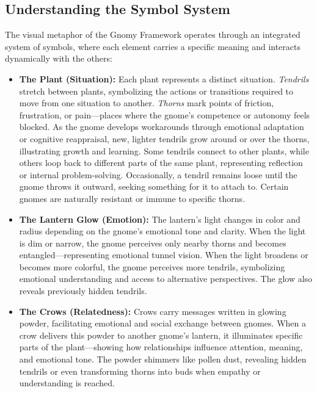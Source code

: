 \documentclass{article}
\begin{document}
\vspace{1em}
\subsection*{Understanding the Symbol System}
The visual metaphor of the Gnomy Framework operates through an integrated system of symbols, where each element carries a specific meaning and interacts dynamically with the others:

\begin{itemize}[noitemsep,topsep=0pt]

    \item \textbf{The Plant (Situation):}  
    Each plant represents a distinct situation. \textit{Tendrils} stretch between plants, symbolizing the actions or transitions required to move from one situation to another. \textit{Thorns} mark points of friction, frustration, or pain—places where the gnome's competence or autonomy feels blocked. As the gnome develops workarounds through emotional adaptation or cognitive reappraisal, new, lighter tendrils grow around or over the thorns, illustrating growth and learning.  
    Some tendrils connect to other plants, while others loop back to different parts of the same plant, representing reflection or internal problem-solving. Occasionally, a tendril remains loose until the gnome throws it outward, seeking something for it to attach to. Certain gnomes are naturally resistant or immune to specific thorns.

    \item \textbf{The Lantern Glow (Emotion):}  
    The lantern’s light changes in color and radius depending on the gnome’s emotional tone and clarity. When the light is dim or narrow, the gnome perceives only nearby thorns and becomes entangled—representing emotional tunnel vision. When the light broadens or becomes more colorful, the gnome perceives more tendrils, symbolizing emotional understanding and access to alternative perspectives. The glow also reveals previously hidden tendrils.

    \item \textbf{The Crows (Relatedness):}  
    Crows carry messages written in glowing powder, facilitating emotional and social exchange between gnomes. When a crow delivers this powder to another gnome’s lantern, it illuminates specific parts of the plant—showing how relationships influence attention, meaning, and emotional tone. The powder shimmers like pollen dust, revealing hidden tendrils or even transforming thorns into buds when empathy or understanding is reached.


\end{itemize}
\end{document}

